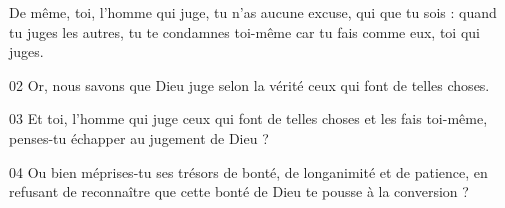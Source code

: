De même, toi, l’homme qui juge, tu n’as aucune excuse, qui que tu sois : quand tu juges les autres, tu te condamnes toi-même car tu fais comme eux, toi qui juges.

02 Or, nous savons que Dieu juge selon la vérité ceux qui font de telles choses.

03 Et toi, l’homme qui juge ceux qui font de telles choses et les fais toi-même, penses-tu échapper au jugement de Dieu ?

04 Ou bien méprises-tu ses trésors de bonté, de longanimité et de patience, en refusant de reconnaître que cette bonté de Dieu te pousse à la conversion ?

